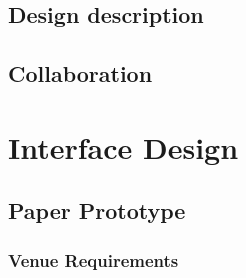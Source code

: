 

\section{Design description}


\section{Collaboration}


\chapter{Interface Design}


\section{Paper Prototype}




\subsection{Venue Requirements}



